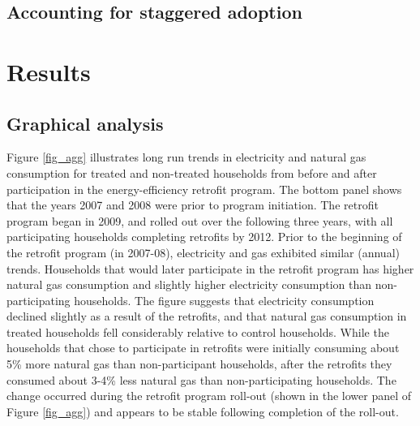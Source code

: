 \documentclass{article}
\begin{document}
\subsection{Accounting for staggered adoption}
 

\section{Results}


\subsection{Graphical analysis}
Figure \ref{fig_agg} illustrates long run trends in electricity and natural gas consumption for treated and non-treated households from before and after participation in the energy-efficiency retrofit program. The bottom panel shows that the years 2007 and 2008 were prior to program initiation. The retrofit program began in 2009, and rolled out over the following three years, with all participating households completing retrofits by 2012. Prior to the beginning of the retrofit program (in 2007-08), electricity and gas exhibited similar (annual) trends. Households that would later participate in the retrofit program has higher natural gas consumption and slightly higher electricity consumption than non-participating households. The figure suggests that electricity consumption declined slightly as a result of the retrofits, and that natural gas consumption in treated households fell considerably relative to control households. While the households that chose to participate in retrofits were initially consuming about 5\% more natural gas than non-participant households, after the retrofits they consumed about 3-4\% less natural gas than non-participating households. The change occurred during the retrofit program roll-out (shown in the lower panel of Figure \ref{fig_agg}) and appears to be stable following completion of the roll-out.
\end{document}
